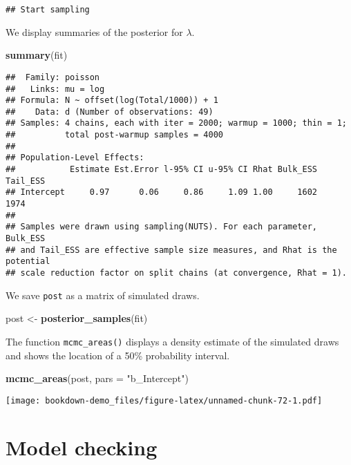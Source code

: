 \documentclass[
]{book}
\newenvironment{Shaded}{\begin{snugshade}}{\end{snugshade}}
\newcommand{\DataTypeTok}[1]{\textcolor[rgb]{0.13,0.29,0.53}{#1}}
\newcommand{\KeywordTok}[1]{\textcolor[rgb]{0.13,0.29,0.53}{\textbf{#1}}}
\newcommand{\NormalTok}[1]{#1}
\newcommand{\StringTok}[1]{\textcolor[rgb]{0.31,0.60,0.02}{#1}}
\begin{document}
\begin{verbatim}
## Start sampling
\end{verbatim}

We display summaries of the posterior for \(\lambda\).

\begin{Shaded}
\begin{Highlighting}[]
\KeywordTok{summary}\NormalTok{(fit)}
\end{Highlighting}
\end{Shaded}

\begin{verbatim}
##  Family: poisson 
##   Links: mu = log 
## Formula: N ~ offset(log(Total/1000)) + 1 
##    Data: d (Number of observations: 49) 
## Samples: 4 chains, each with iter = 2000; warmup = 1000; thin = 1;
##          total post-warmup samples = 4000
## 
## Population-Level Effects: 
##           Estimate Est.Error l-95% CI u-95% CI Rhat Bulk_ESS Tail_ESS
## Intercept     0.97      0.06     0.86     1.09 1.00     1602     1974
## 
## Samples were drawn using sampling(NUTS). For each parameter, Bulk_ESS
## and Tail_ESS are effective sample size measures, and Rhat is the potential
## scale reduction factor on split chains (at convergence, Rhat = 1).
\end{verbatim}

We save \texttt{post} as a matrix of simulated draws.

\begin{Shaded}
\begin{Highlighting}[]
\NormalTok{post <-}\StringTok{ }\KeywordTok{posterior_samples}\NormalTok{(fit)}
\end{Highlighting}
\end{Shaded}

The function \texttt{mcmc\_areas()} displays a density estimate of the simulated draws and shows the location of a 50\% probability interval.

\begin{Shaded}
\begin{Highlighting}[]
\KeywordTok{mcmc_areas}\NormalTok{(post, }\DataTypeTok{pars =} \StringTok{"b_Intercept"}\NormalTok{)}
\end{Highlighting}
\end{Shaded}

\texttt{[image: bookdown-demo\_files/figure-latex/unnamed-chunk-72-1.pdf]}

\hypertarget{model-checking}{%
\section{Model checking}\label{model-checking}}
\end{document}
